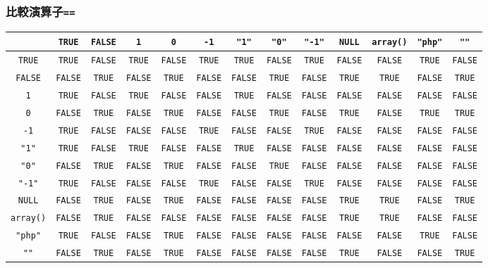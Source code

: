 \documentclass[dvipsk]{beamer}
\begin{document}
\begin{frame}[containsverbatim]
\frametitle{比較演算子\texttt{==}}\tiny
\setlength{\tabcolsep}{0.2em}
\begin{center}
  \begin{tabular}{|*{13}{c|}}\hline
 &\verb+TRUE+&\verb+FALSE+&\verb+1+&\verb+0+&\verb+-1+&\verb+"1"+&\verb+"0"+&\verb+"-1"+&\verb+NULL+&\verb+array()+&\verb+"php"+&\verb+""+\\\hline
\verb+TRUE+&\verb+TRUE+&\verb+FALSE+&\verb+TRUE+&\verb+FALSE+&\verb+TRUE+&\verb+TRUE+&\verb+FALSE+&\verb+TRUE+&\verb+FALSE+&\verb+FALSE+&\verb+TRUE+&\verb+FALSE+\\\hline
\verb+FALSE+&\verb+FALSE+&\verb+TRUE+&\verb+FALSE+&\verb+TRUE+&\verb+FALSE+&\verb+FALSE+&\verb+TRUE+&\verb+FALSE+&\verb+TRUE+&\verb+TRUE+&\verb+FALSE+&\verb+TRUE+\\\hline
\verb+1+&\verb+TRUE+&\verb+FALSE+&\verb+TRUE+&\verb+FALSE+&\verb+FALSE+&\verb+TRUE+&\verb+FALSE+&\verb+FALSE+&\verb+FALSE+&\verb+FALSE+&\verb+FALSE+&\verb+FALSE+\\\hline
\verb+0+&\verb+FALSE+&\verb+TRUE+&\verb+FALSE+&\verb+TRUE+&\verb+FALSE+&\verb+FALSE+&\verb+TRUE+&\verb+FALSE+&\verb+TRUE+&\verb+FALSE+&\verb+TRUE+&\verb+TRUE+\\\hline
\verb+-1+&\verb+TRUE+&\verb+FALSE+&\verb+FALSE+&\verb+FALSE+&\verb+TRUE+&\verb+FALSE+&\verb+FALSE+&\verb+TRUE+&\verb+FALSE+&\verb+FALSE+&\verb+FALSE+&\verb+FALSE+\\\hline
\verb+"1"+&\verb+TRUE+&\verb+FALSE+&\verb+TRUE+&\verb+FALSE+&\verb+FALSE+&\verb+TRUE+&\verb+FALSE+&\verb+FALSE+&\verb+FALSE+&\verb+FALSE+&\verb+FALSE+&\verb+FALSE+\\\hline
\verb+"0"+&\verb+FALSE+&\verb+TRUE+&\verb+FALSE+&\verb+TRUE+&\verb+FALSE+&\verb+FALSE+&\verb+TRUE+&\verb+FALSE+&\verb+FALSE+&\verb+FALSE+&\verb+FALSE+&\verb+FALSE+\\\hline
\verb+"-1"+&\verb+TRUE+&\verb+FALSE+&\verb+FALSE+&\verb+FALSE+&\verb+TRUE+&\verb+FALSE+&\verb+FALSE+&\verb+TRUE+&\verb+FALSE+&\verb+FALSE+&\verb+FALSE+&\verb+FALSE+\\\hline
\verb+NULL+&\verb+FALSE+&\verb+TRUE+&\verb+FALSE+&\verb+TRUE+&\verb+FALSE+&\verb+FALSE+&\verb+FALSE+&\verb+FALSE+&\verb+TRUE+&\verb+TRUE+&\verb+FALSE+&\verb+TRUE+\\\hline
\verb+array()+&\verb+FALSE+&\verb+TRUE+&\verb+FALSE+&\verb+FALSE+&\verb+FALSE+&\verb+FALSE+&\verb+FALSE+&\verb+FALSE+&\verb+TRUE+&\verb+TRUE+&\verb+FALSE+&\verb+FALSE+\\\hline
\verb+"php"+&\verb+TRUE+&\verb+FALSE+&\verb+FALSE+&\verb+TRUE+&\verb+FALSE+&\verb+FALSE+&\verb+FALSE+&\verb+FALSE+&\verb+FALSE+&\verb+FALSE+&\verb+TRUE+&\verb+FALSE+\\\hline
\verb+""+&\verb+FALSE+&\verb+TRUE+&\verb+FALSE+&\verb+TRUE+&\verb+FALSE+&\verb+FALSE+&\verb+FALSE+&\verb+FALSE+&\verb+TRUE+&\verb+FALSE+&\verb+FALSE+&\verb+TRUE+\\\hline
  \end{tabular}
\end{center}
\end{frame}
\end{document}
